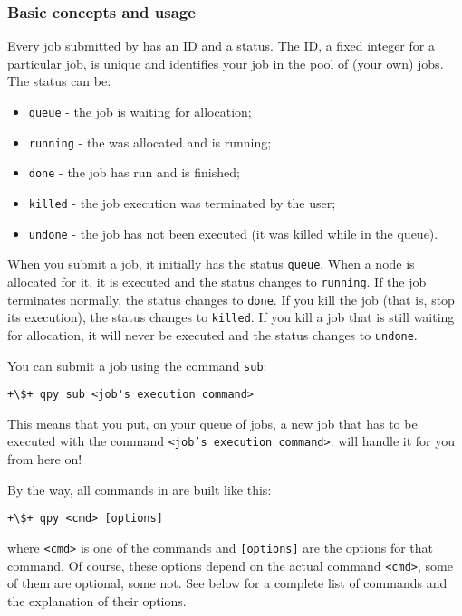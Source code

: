 \documentclass[a4paper,12pt]{article}
\begin{document}
\subsubsection{Basic concepts and usage}

Every job submitted by \qpy{} has an ID and a status.
The ID, a fixed integer for a particular job, is unique and identifies your job in the pool of (your own) jobs.
The status can be:

\begin{itemize}
\item \texttt{queue}   - the job is waiting for allocation;
\item \texttt{running} - the was allocated and is running;
\item \texttt{done}    - the job has run and is finished;
\item \texttt{killed}  - the job execution was terminated by the user;
\item \texttt{undone}  - the job has not been executed (it was killed while in the queue).
\end{itemize}

When you submit a job, it initially has the  status \texttt{queue}.
When a node is allocated for it, it is executed and the status changes to \texttt{running}.
If the job terminates normally, the status changes to \texttt{done}.
If you kill the job (that is, stop its execution), the status changes to \texttt{killed}.
If you kill a job that is still waiting for allocation, it will never be executed and the status changes to \texttt{undone}.

You can submit a job using the command \texttt{sub}:
\begin{lstlisting}[style=BashStyle]
+\$+ qpy sub <job's execution command>
\end{lstlisting}
This means that you put, on your queue of jobs, a new job that has to be executed with the command \texttt{<job's execution command>}.
\qpy{} will handle it for you from here on!

By the way, all commands in \qpy{} are built like this:
\begin{lstlisting}[style=BashStyle]
+\$+ qpy <cmd> [options]
\end{lstlisting}
where \texttt{<cmd>} is one of the \qpy{} commands and \texttt{[options]} are the options for that command.
Of course, these options depend on the actual command \texttt{<cmd>}, some of them are optional, some not.
See below for a complete list of commands and the explanation of their options.
\end{document}
